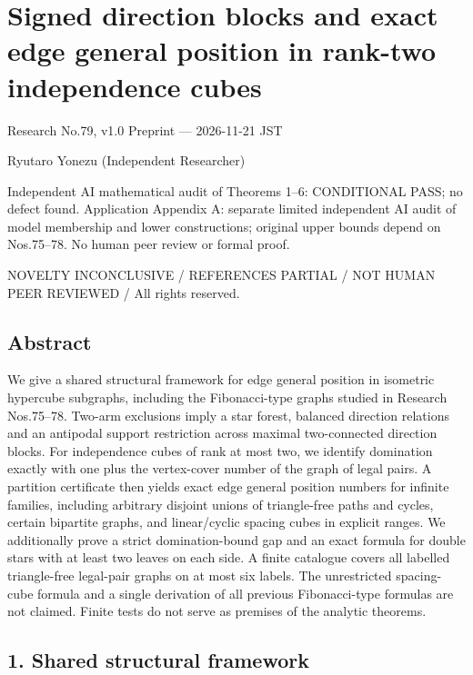 \documentclass[
]{article}
\author{}
\date{}
\begin{document}
\section{Signed direction blocks and exact edge general position in
rank-two independence
cubes}\label{signed-direction-blocks-and-exact-edge-general-position-in-rank-two-independence-cubes}

Research No.79, v1.0 Preprint --- 2026-11-21 JST

Ryutaro Yonezu (Independent Researcher)

Independent AI mathematical audit of Theorems 1--6: CONDITIONAL PASS; no
defect found. Application Appendix A: separate limited independent AI
audit of model membership and lower constructions; original upper bounds
depend on Nos.75--78. No human peer review or formal proof.

NOVELTY INCONCLUSIVE / REFERENCES PARTIAL / NOT HUMAN PEER REVIEWED /
All rights reserved.

\subsection{Abstract}\label{abstract}

We give a shared structural framework for edge general position in
isometric hypercube subgraphs, including the Fibonacci-type graphs
studied in Research Nos.75--78. Two-arm exclusions imply a star forest,
balanced direction relations and an antipodal support restriction across
maximal two-connected direction blocks. For independence cubes of rank
at most two, we identify domination exactly with one plus the
vertex-cover number of the graph of legal pairs. A partition certificate
then yields exact edge general position numbers for infinite families,
including arbitrary disjoint unions of triangle-free paths and cycles,
certain bipartite graphs, and linear/cyclic spacing cubes in explicit
ranges. We additionally prove a strict domination-bound gap and an exact
formula for double stars with at least two leaves on each side. A finite
catalogue covers all labelled triangle-free legal-pair graphs on at most
six labels. The unrestricted spacing-cube formula and a single
derivation of all previous Fibonacci-type formulas are not claimed.
Finite tests do not serve as premises of the analytic theorems.

\subsection{1. Shared structural
framework}\label{shared-structural-framework}
\end{document}
